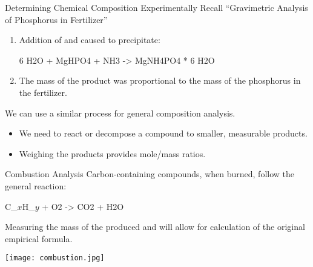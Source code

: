 \documentclass[handout]{beamer}
\begin{document}
\begin{frame}{Determining Chemical Composition Experimentally}
	Recall ``Gravimetric Analysis of Phosphorus in Fertilizer'' %
			\begin{enumerate}
				\item Addition of  and  caused  to precipitate:
					{\small\begin{reaction*}
						6 H2O\lqd{} + MgHPO4\aq{} +
						NH3\aq{} ->
						MgNH4PO4 * 6 H2O\sld{}
					\end{reaction*}}
				\item The mass of the product was proportional
					to the mass of the phosphorus in the
					fertilizer.
			\end{enumerate}
			\pause

			\bigskip
			\mode<article>{\noindent}
			We can use a similar process for general composition
			analysis.
			\begin{itemize}
				\item We need to \alert{react} or
					\alert{decompose} a compound to smaller,
					measurable products.
				\item Weighing the products provides mole/mass
					ratios.
			\end{itemize}
\end{frame}

\begin{frame}{Combustion Analysis}
	Carbon-containing compounds, when burned, follow the general reaction:
	\begin{reaction*}
		C_{$x$}H_{$y$} + O2 -> CO2 + H2O \qquad \text{\footnotesize
		(unbalanced)}
	\end{reaction*}
	Measuring the mass of the produced  and  will allow for
	calculation of the original \alert{empirical formula}.
	\begin{center}
		\texttt{[image: combustion.jpg]}
	\end{center}
\end{frame}
\end{document}

